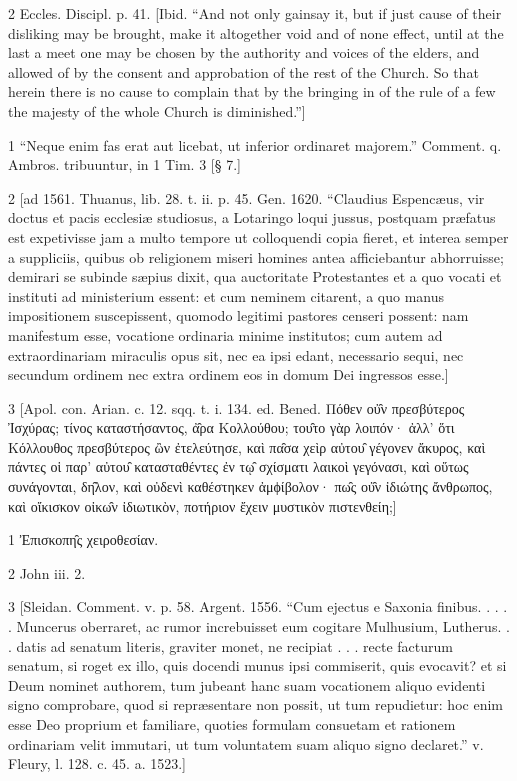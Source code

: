 2
Eccles. Discipl. p. 41. [Ibid. “And not only gainsay it, but if just cause of their disliking may be brought, make it altogether void and of none effect, until at the last a meet one may be chosen by the authority and voices of the elders, and allowed of by the consent and approbation of the rest of the Church. So that herein there is no cause to complain that by the bringing in of the rule of a few the majesty of the whole Church is diminished.”]

1
“Neque enim fas erat aut licebat, ut inferior ordinaret majorem.” Comment. q. Ambros. tribuuntur, in 1 Tim. 3 [§ 7.]

2
[ad 1561. Thuanus, lib. 28. t. ii. p. 45. Gen. 1620. “Claudius Espencæus, vir doctus et pacis ecclesiæ studiosus, a Lotaringo loqui jussus, postquam præfatus est expetivisse jam a multo tempore ut colloquendi copia fieret, et interea semper a suppliciis, quibus ob religionem miseri homines antea afficiebantur abhorruisse; demirari se subinde sæpius dixit, qua auctoritate Protestantes et a quo vocati et instituti ad ministerium essent: et cum neminem citarent, a quo manus impositionem suscepissent, quomodo legitimi pastores censeri possent: nam manifestum esse, vocatione ordinaria minime institutos; cum autem ad extraordinariam miraculis opus sit, nec ea ipsi edant, necessario sequi, nec secundum ordinem nec extra ordinem eos in domum Dei ingressos esse.]

3
[Apol. con. Arian. c. 12. sqq. t. i. 134. ed. Bened. Πόθεν οὐ̑ν πρεσβύτερος Ἰσχύρας; τίνος καταστήσαντος, ἀ̑ρα Κολλούθου; του̑το γὰρ λοιπόν· ἀλλ’ ὅτι Κόλλουθος πρεσβύτερος ὢν ἐτελεύτησε, καὶ πα̑σα χεὶρ αὐτου̑ γέγονεν ἄκυρος, καὶ πάντες οἱ παρ’ αὐτου̑ κατασταθέντες ἐν τῳ̑ σχίσματι λαικοὶ γεγόνασι, καὶ οὕτως συνάγονται, δη̑λον, καὶ οὐδενὶ καθέστηκεν ἀμϕίβολον· πω̑ς οὐ̑ν ἰδιώτης ἄνθρωπος, καὶ οἴκισκον οἰκω̑ν ἰδιωτικὸν, ποτήριον ἔχειν μυστικὸν πιστενθείη;]

1
Ἐπισκοπη̑ς χειροθεσίαν.

2
John iii. 2.

3
[Sleidan. Comment. v. p. 58. Argent. 1556. “Cum ejectus e Saxonia finibus. . . . . Muncerus oberraret, ac rumor increbuisset eum cogitare Mulhusium, Lutherus. . . datis ad senatum literis, graviter monet, ne recipiat . . . recte facturum senatum, si roget ex illo, quis docendi munus ipsi commiserit, quis evocavit? et si Deum nominet authorem, tum jubeant hanc suam vocationem aliquo evidenti signo comprobare, quod si repræsentare non possit, ut tum repudietur: hoc enim esse Deo proprium et familiare, quoties formulam consuetam et rationem ordinariam velit immutari, ut tum voluntatem suam aliquo signo declaret.” v. Fleury, l. 128. c. 45. a. 1523.]

